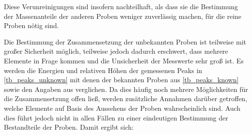\documentclass[
	a4paper,
	12pt,
	pagesize,
	ngerman
]{scrartcl}
\begin{document}
	Diese Verunreinigungen sind insofern nachteilhaft, als dass sie die Bestimmung der Massenanteile der anderen Proben weniger zuverlässig machen, für die reine Proben nötig sind.

	Die Bestimmung der Zusammensetzung der unbekannten Proben ist teilweise mit großer Sicherheit möglich, teilweise jedoch dadurch erschwert, dass mehrere Elemente in Frage kommen und die Unsicherheit der Messwerte sehr groß ist.
	Es werden die Energien und relativen Höhen der gemessenen Peaks in \cref{tb_peaks_unknown} mit denen der bekannten Proben aus \cref{tb_peaks_known} sowie den Angaben aus \cite{XRAYDB} verglichen.
	Da dies häufig noch mehrere Möglichkeiten für die Zusammensetzung offen ließ, werden zusätzliche Annahmen darüber getroffen, welche Elemente auf Basis des Aussehens der Proben wahrscheinlich sind.
	Auch dies führt jedoch nicht in allen Fällen zu einer eindeutigen Bestimmung der Bestandteile der Proben.
	Damit ergibt sich:
\end{document}
